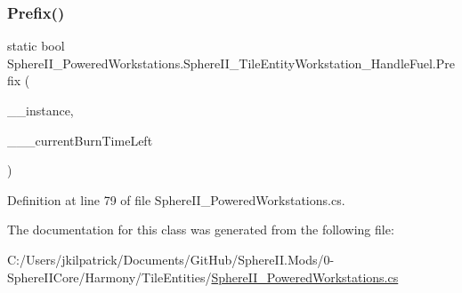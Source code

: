 \subsubsection{\texorpdfstring{Prefix()}{Prefix()}}
{\footnotesize\ttfamily static bool Sphere\+I\+I\+\_\+\+Powered\+Workstations.\+Sphere\+I\+I\+\_\+\+Tile\+Entity\+Workstation\+\_\+\+Handle\+Fuel.\+Prefix (\begin{DoxyParamCaption}\item[{Tile\+Entity\+Workstation}]{\+\_\+\+\_\+instance,  }\item[{ref float}]{\+\_\+\+\_\+\+\_\+current\+Burn\+Time\+Left }\end{DoxyParamCaption})\hspace{0.3cm}{\ttfamily [static]}}



Definition at line 79 of file Sphere\+I\+I\+\_\+\+Powered\+Workstations.\+cs.



The documentation for this class was generated from the following file\+:\begin{DoxyCompactItemize}
\item 
C\+:/\+Users/jkilpatrick/\+Documents/\+Git\+Hub/\+Sphere\+I\+I.\+Mods/0-\/\+Sphere\+I\+I\+Core/\+Harmony/\+Tile\+Entities/\mbox{\hyperlink{_sphere_i_i___powered_workstations_8cs}{Sphere\+I\+I\+\_\+\+Powered\+Workstations.\+cs}}\end{DoxyCompactItemize}
